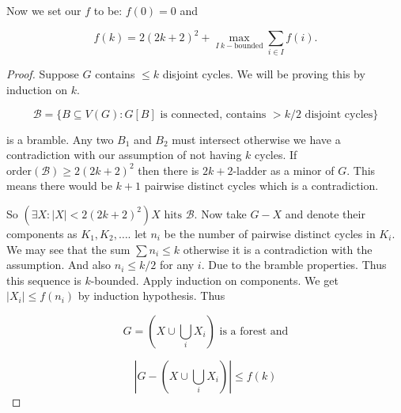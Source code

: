 Now we set our $f$ to be: $f(0) =0$ and

$$
f(k) = 2(2k+2)^2 + \max_{I \ k-\text{bounded}} \sum_{i \in I} f(i).
$$

\begin{proof}
	Suppose $G$ contains $\leq k$ disjoint cycles. We will be proving this by induction on $k$.
	
	$$
	\mathcal{B} = \{B \subseteq V(G) : G[B] \text{ is connected, contains } > k/2 \text{ disjoint cycles}\}
	$$
	
	is a bramble. Any two $B_{1}$ and $B_{2}$ must intersect otherwise we have a contradiction with our assumption of not having $k$ cycles. If $\text{order}(\mathcal{B}) \geq 2(2k+2)^2$ then there is $2k+2$-ladder as a minor of $G$. This means there would be $k+1$ pairwise distinct cycles which is a contradiction.
	
	So $(\exists X : |X| < 2(2k+2)^2) X \text{ hits } \mathcal{B}$. Now take $G - X$ and denote their components as $K_{1}, K_{2}, \dots$. let $n_{i}$ be the number of pairwise distinct cycles in $K_{i}$. We may see that the sum $\sum n_{i} \leq k$ otherwise it is a contradiction with the assumption. And also $n_{i} \leq k/2$ for any $i$. Due to the bramble properties. Thus this sequence is $k$-bounded. Apply induction on components. We get $|X_{i}| \leq f(n_{i})$ by induction hypothesis. Thus
	
	$$
	G = (X \cup \bigcup_{i} X_{i}) \text{ is a forest and}
	$$
	
	$$
	|G - (X \cup \bigcup_{i} X_{i})| \leq f(k)
	$$
\end{proof}